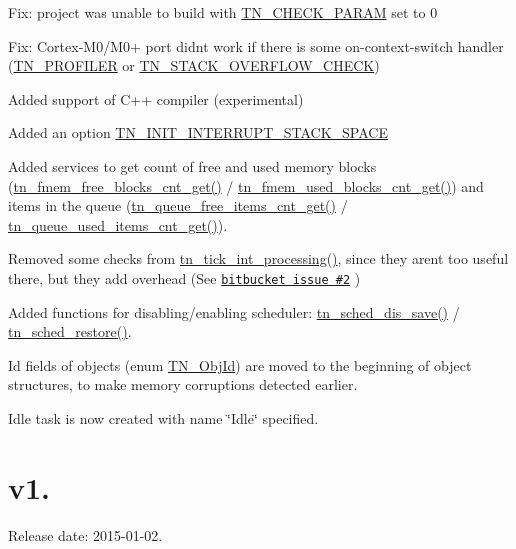 \begin{DoxyItemize}
\item Fix\+: project was unable to build with {\ttfamily \hyperlink{tn__cfg__default_8h_a1f197294df3276fec431930545acafd5}{T\+N\+\_\+\+C\+H\+E\+C\+K\+\_\+\+P\+A\+R\+AM}} set to 0
\item Fix\+: Cortex-\/\+M0/\+M0+ port didn\textquotesingle{}t work if there is some on-\/context-\/switch handler ({\ttfamily \hyperlink{tn__cfg__default_8h_a49a546b18cc1f75b51d4cf8b290634dd}{T\+N\+\_\+\+P\+R\+O\+F\+I\+L\+ER}} or {\ttfamily \hyperlink{tn__cfg__default_8h_ac6a9bbac3b3b25d9b5bc8c21d2e09955}{T\+N\+\_\+\+S\+T\+A\+C\+K\+\_\+\+O\+V\+E\+R\+F\+L\+O\+W\+\_\+\+C\+H\+E\+CK}})
\item Added support of C++ compiler (experimental)
\item Added an option {\ttfamily \hyperlink{tn__cfg__default_8h_aab948a5a8178594322f364800e0e53ee}{T\+N\+\_\+\+I\+N\+I\+T\+\_\+\+I\+N\+T\+E\+R\+R\+U\+P\+T\+\_\+\+S\+T\+A\+C\+K\+\_\+\+S\+P\+A\+CE}}
\item Added services to get count of free and used memory blocks ({\ttfamily \hyperlink{tn__fmem_8h_ae8b80e0a0a8b07e11acbc4f15f3ef32d}{tn\+\_\+fmem\+\_\+free\+\_\+blocks\+\_\+cnt\+\_\+get()}} / {\ttfamily \hyperlink{tn__fmem_8h_a2f23f2cdb3e6f3f2a1c1f9ebc4e6e8cb}{tn\+\_\+fmem\+\_\+used\+\_\+blocks\+\_\+cnt\+\_\+get()}}) and items in the queue ({\ttfamily \hyperlink{tn__dqueue_8h_af541f16598e13f980ddc2482e6af6044}{tn\+\_\+queue\+\_\+free\+\_\+items\+\_\+cnt\+\_\+get()}} / {\ttfamily \hyperlink{tn__dqueue_8h_aa17fd667cab2e4a41d9e89b8cba603cd}{tn\+\_\+queue\+\_\+used\+\_\+items\+\_\+cnt\+\_\+get()}}).
\item Removed some checks from {\ttfamily \hyperlink{tn__sys_8h_aa44d297639e0520420890ef2bb7e2c1c}{tn\+\_\+tick\+\_\+int\+\_\+processing()}}, since they aren\textquotesingle{}t too useful there, but they add overhead (See \href{https://bitbucket.org/dfrank/tneokernel/issue/2/system-clock-service-routine-could-be-more}{\tt bitbucket issue \#2} )
\item Added functions for disabling/enabling scheduler\+: {\ttfamily \hyperlink{tn__sys_8h_af1502619506a9c92eb954e45ff0f461b}{tn\+\_\+sched\+\_\+dis\+\_\+save()}} / {\ttfamily \hyperlink{tn__sys_8h_a4cd5c9113872b2008184c567907653bd}{tn\+\_\+sched\+\_\+restore()}}.
\item Id fields of objects ({\ttfamily enum \hyperlink{tn__common_8h_ae779dd1f6735f6e139fb70acd004d976}{T\+N\+\_\+\+Obj\+Id}}) are moved to the beginning of object structures, to make memory corruptions detected earlier.
\item Idle task is now created with name \char`\"{}\+Idle\char`\"{} specified.
\end{DoxyItemize}\hypertarget{changelog_changelog_v1_06}{}\section{v1.}\label{changelog_changelog_v1_06}
Release date\+: 2015-\/01-\/02.


